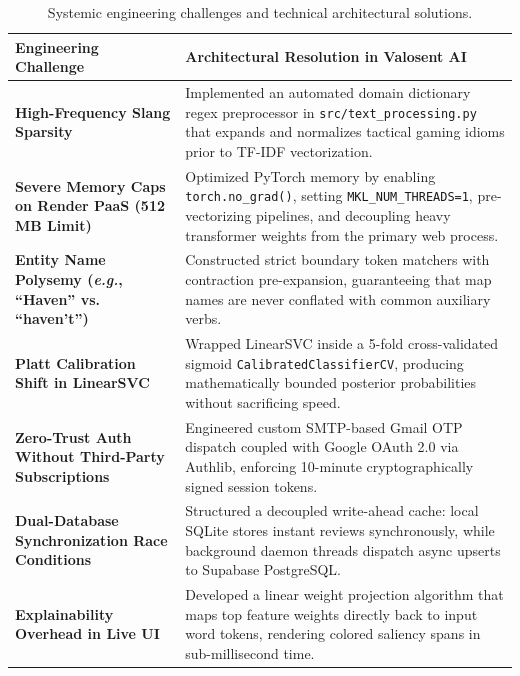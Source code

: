 \begin{table}[htbp]
\centering
\small
\caption{Systemic engineering challenges and technical architectural solutions.}
\label{tab:challenges_solutions}
\begin{tabularx}{\textwidth}{P{4.2cm} L}
\toprule
\textbf{Engineering Challenge} & \textbf{Architectural Resolution in Valosent AI} \\
\midrule
\textbf{High-Frequency Slang Sparsity} & Implemented an automated domain dictionary regex preprocessor in \texttt{src/text\_processing.py} that expands and normalizes tactical gaming idioms prior to TF-IDF vectorization. \\
\addlinespace
\textbf{Severe Memory Caps on Render PaaS (512\,MB Limit)} & Optimized PyTorch memory by enabling \texttt{torch.no\_grad()}, setting \texttt{MKL\_NUM\_THREADS=1}, pre-vectorizing pipelines, and decoupling heavy transformer weights from the primary web process. \\
\addlinespace
\textbf{Entity Name Polysemy (\textit{e.g.}, ``Haven'' vs. ``haven't'')} & Constructed strict boundary token matchers with contraction pre-expansion, guaranteeing that map names are never conflated with common auxiliary verbs. \\
\addlinespace
\textbf{Platt Calibration Shift in LinearSVC} & Wrapped LinearSVC inside a 5-fold cross-validated sigmoid \texttt{CalibratedClassifierCV}, producing mathematically bounded posterior probabilities without sacrificing speed. \\
\addlinespace
\textbf{Zero-Trust Auth Without Third-Party Subscriptions} & Engineered custom SMTP-based Gmail OTP dispatch coupled with Google OAuth 2.0 via Authlib, enforcing 10-minute cryptographically signed session tokens. \\
\addlinespace
\textbf{Dual-Database Synchronization Race Conditions} & Structured a decoupled write-ahead cache: local SQLite stores instant reviews synchronously, while background daemon threads dispatch async upserts to Supabase PostgreSQL. \\
\addlinespace
\textbf{Explainability Overhead in Live UI} & Developed a linear weight projection algorithm that maps top feature weights directly back to input word tokens, rendering colored saliency spans in sub-millisecond time. \\
\bottomrule
\end{tabularx}
\end{table}
